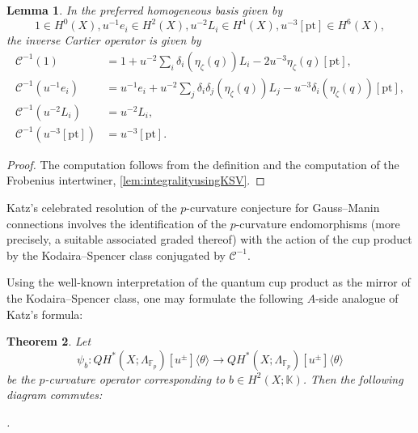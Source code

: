 \documentclass[reqno]{amsart}
\numberwithin{equation}{section}
\numberwithin{equation}{section}
\numberwithin{equation}{section}
\newtheorem{thm}{Theorem}[section]
\newtheorem{lemma}[thm]{Lemma}
\theoremstyle{definition}
\theoremstyle{remark}
\theoremstyle{remark}
\begin{document}
\begin{lemma}\label{lem:Cartier-computation}
In the preferred homogeneous basis given by $$1 \in H^0(X), u^{-1}e_i \in H^2(X), u^{-2}L_i \in H^4(X), u^{-3}[\mathrm{pt}] \in H^6(X),$$ the inverse Cartier operator is given by
\begin{align}
\mathcal{C}^{-1} (1) &= 1 + u^{-2}  \sum_i\delta_i (\eta_{\zeta}(q))   L_i - 2 u^{-3} \eta_{\zeta}(q)  [\mathrm{pt}], \\
\mathcal{C}^{-1} (u^{-1}e_i) &=  u^{-1}e_i +  u^{-2} \sum_j \delta_{i}\delta_{j}(\eta_{\zeta}(q)) L_j  - u^{-3}\delta_i(\eta_{\zeta}(q)) [\mathrm{pt}],\nonumber \\
\mathcal{C}^{-1} (u^{-2}L_i) &= u^{-2}L_i, \\
\mathcal{C}^{-1} (u^{-3}[\mathrm{pt}])&=u^{-3}[\mathrm{pt}] \nonumber  .
\end{align}
\end{lemma}
\begin{proof}
    The computation follows from the definition and the computation of the Frobenius intertwiner, \cref{lem:integralityusingKSV}.
\end{proof}

Katz's celebrated resolution of the $p$-curvature conjecture for Gauss--Manin connections involves the identification of the $p$-curvature endomorphisms (more precisely, a suitable associated graded thereof) with the action of the cup product by the Kodaira--Spencer class conjugated by $\mathcal{C}^{-1}$. 

Using the well-known interpretation of the quantum cup product as the mirror of the Kodaira--Spencer class, one may formulate the following $A$-side analogue of Katz's formula:

\begin{thm}\label{thm:Cartierconjugation-body}
    Let
    \begin{equation}
        \psi_b : QH^{*}(X;\Lambda_{\mathbb{F}_p})[u^\pm]\langle \theta \rangle \to QH^{*}(X;\Lambda_{\mathbb{F}_p})[u^\pm]\langle \theta \rangle
    \end{equation}
    be the $p$-curvature operator corresponding to $b \in H^2(X;\mathbb{K})$. Then the following diagram commutes:

    \begin{center}
        .
    \end{center}
\end{thm}
\end{document}
